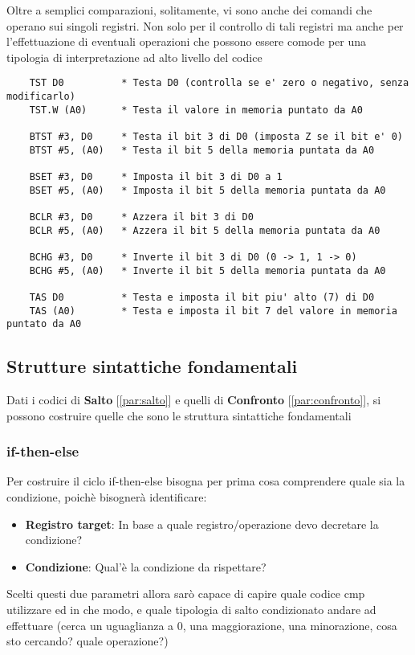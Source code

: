 Oltre a semplici comparazioni, solitamente, vi sono anche dei comandi che operano sui singoli registri. Non solo per il controllo di tali registri ma anche per l'effettuazione di eventuali operazioni che possono essere comode per una tipologia di interpretazione ad alto livello del codice
\begin{lstlisting}
    TST D0          * Testa D0 (controlla se e' zero o negativo, senza modificarlo)
    TST.W (A0)      * Testa il valore in memoria puntato da A0

    BTST #3, D0     * Testa il bit 3 di D0 (imposta Z se il bit e' 0)
    BTST #5, (A0)   * Testa il bit 5 della memoria puntata da A0

    BSET #3, D0     * Imposta il bit 3 di D0 a 1
    BSET #5, (A0)   * Imposta il bit 5 della memoria puntata da A0

    BCLR #3, D0     * Azzera il bit 3 di D0
    BCLR #5, (A0)   * Azzera il bit 5 della memoria puntata da A0

    BCHG #3, D0     * Inverte il bit 3 di D0 (0 -> 1, 1 -> 0)
    BCHG #5, (A0)   * Inverte il bit 5 della memoria puntata da A0

    TAS D0          * Testa e imposta il bit piu' alto (7) di D0
    TAS (A0)        * Testa e imposta il bit 7 del valore in memoria puntato da A0
\end{lstlisting}

\subsection{Strutture sintattiche fondamentali}
Dati i codici di \textbf{Salto} [\ref{par:salto}] e quelli di \textbf{Confronto} [\ref{par:confronto}], si possono costruire quelle che sono le struttura sintattiche fondamentali

\subsubsection{if-then-else}
Per costruire il ciclo if-then-else bisogna per prima cosa comprendere quale sia la condizione, poichè bisognerà identificare:
\begin{itemize}
    \item \textbf{Registro target}: In base a quale registro/operazione devo decretare la condizione?
    \item \textbf{Condizione}: Qual'è la condizione da rispettare?
\end{itemize}

Scelti questi due parametri allora sarò capace di capire quale codice cmp utilizzare ed in che modo, e quale tipologia di salto condizionato andare ad effettuare (cerca un uguaglianza a 0, una maggiorazione, una minorazione, cosa sto cercando? quale operazione?)

